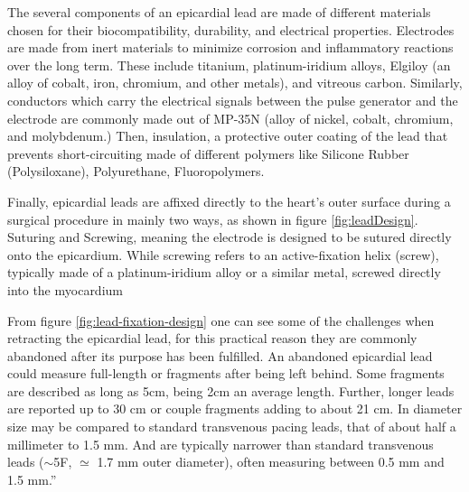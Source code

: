 The several components of an epicardial lead are made of different materials chosen for their biocompatibility, durability, and electrical properties. Electrodes are made from inert materials to minimize corrosion and inflammatory reactions over the long term. These include titanium, platinum-iridium alloys, Elgiloy (an alloy of cobalt, iron, chromium, and other metals), and vitreous carbon. Similarly, conductors which carry the electrical signals between the pulse generator and the electrode are commonly made out of MP-35N (alloy of nickel, cobalt, chromium, and molybdenum.) Then, insulation, a protective outer coating of the lead that prevents short-circuiting made of different polymers like Silicone Rubber (Polysiloxane), Polyurethane, Fluoropolymers.

Finally, epicardial leads are affixed directly to the heart's outer surface during a surgical procedure in mainly two ways, as shown in figure \ref{fig:leadDesign}.
Suturing and Screwing, meaning the electrode is designed to be sutured directly onto the epicardium. While screwing refers to an active-fixation helix (screw), typically made of a platinum-iridium alloy or a similar metal, screwed directly into the myocardium \cite{Ellenbogen_CCPDRT_4th_2011}

From figure \ref{fig:lead-fixation-design} one can see some of the challenges when retracting the epicardial lead, for this practical  reason they are commonly abandoned after its purpose has been fulfilled. An abandoned epicardial lead could measure full-length or fragments after being left behind. Some fragments are described as long as 5cm, being 2cm an average length. Further, longer leads are reported up to 30 cm or couple fragments adding to about 21 cm. In diameter size may be compared to standard transvenous pacing leads, that of about half a millimeter to 1.5 mm. And are typically narrower than standard transvenous leads ($\sim$5F, $\simeq$ 1.7 mm outer diameter), often measuring between 0.5 mm and 1.5 mm.”


